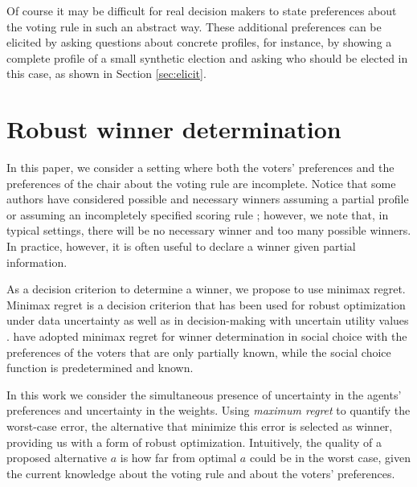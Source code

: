 Of course it may be difficult for real decision makers to state preferences about the voting rule in such an abstract way.
These additional preferences can be elicited by asking questions about concrete profiles, for instance, by showing a complete profile of a small synthetic election and asking who should be elected in this case, as shown in Section \ref{sec:elicit}.

\section[Minimax regret under partial profile and weight information]{
Robust winner determination}
\label{sec:mmr}

In this paper, we consider a setting where both the voters' preferences and the preferences of the chair about the voting rule are incomplete.
Notice that some authors have considered possible and necessary winners assuming a partial profile  \citep{Xia2008} or assuming an incompletely specified scoring rule \citep{Viappiani2018};
however, we note that, in typical settings, there will be no necessary winner and too many possible winners.
In practice, however, it is often useful to declare a winner given partial information.

As a decision criterion to determine a winner, we propose to use minimax regret. 
Minimax regret \citep{Savage1954} is a decision criterion that has been used for robust optimization under data uncertainty \citep{Kouvelis1997} as well as in decision-making with uncertain utility values \citep{Salo2001,Boutilier2006}.
\citet{Lu2011} have adopted minimax regret for winner determination in social choice with
the preferences of the voters that are only partially known, while the social choice function is predetermined and known.

In this work we consider the simultaneous presence of uncertainty in the agents' preferences and uncertainty in the weights.
Using {\em maximum regret} to quantify the worst-case error, the alternative that minimize this error is selected as winner, providing us with a form of robust optimization.
Intuitively, the quality of a proposed alternative $a$ is how far from optimal $a$  could be in the worst case, given the current knowledge about the voting rule and about the voters' preferences.

